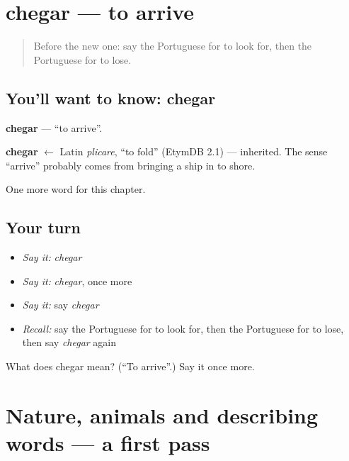 \section[chegar]{chegar — to arrive}

\label{lesson:PT-C81-chegar}



\begin{quote}
Before the new one: say the Portuguese for to look for, then the Portuguese for to lose.
\end{quote}

\subsection*{You'll want to know: chegar}
\textbf{chegar} — \textquotedblleft{}to arrive\textquotedblright{}.

\begin{cousinweb}
\textbf{chegar} $\leftarrow$ Latin \emph{plicare}, \textquotedblleft{}to fold\textquotedblright{} (EtymDB 2.1) — inherited. The sense \textquotedblleft{}arrive\textquotedblright{} probably comes from bringing a ship in to shore.
\end{cousinweb}

\begin{grammarlens}[title={What you've built}]
One more word for this chapter.
\end{grammarlens}

\subsection*{Your turn}
\begin{itemize}
\raggedright
  \item \emph{Say it:} \emph{chegar}
  \item \emph{Say it:} \emph{chegar}, once more
  \item \emph{Say it:} say \emph{chegar}
  \item \emph{Recall:} say the Portuguese for to look for, then the Portuguese for to lose, then say \emph{chegar} again
\end{itemize}

\begin{tcolorbox}[breakable,colback=teal!4,colframe=teal!35!black,title={Before you move on}]
What does chegar mean? (\textquotedblleft{}To arrive\textquotedblright{}.) Say it once more.
\end{tcolorbox}
\section[(dialogue)]{Nature, animals and describing words — a first pass}

